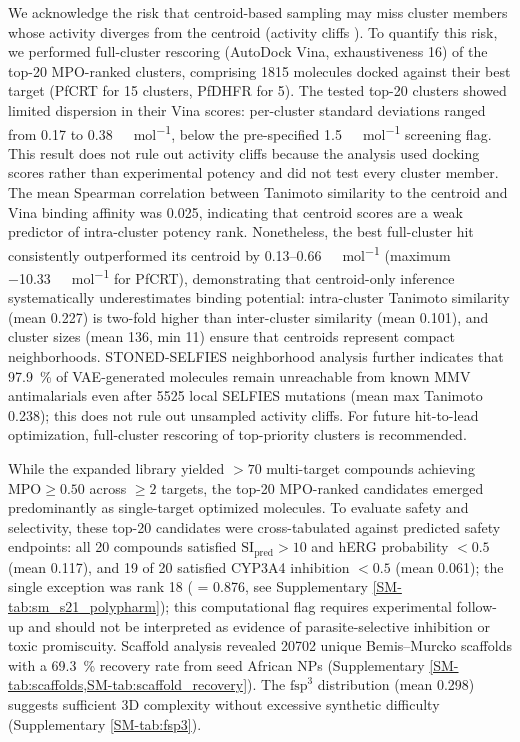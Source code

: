 \documentclass[journal=jcisd8,manuscript=article]{achemso}
\begin{document}
We acknowledge the risk that centroid-based sampling may miss cluster members whose activity diverges from the centroid (activity cliffs \cite{Maggiora2006}).
To quantify this risk, we performed full-cluster rescoring (AutoDock Vina, exhaustiveness \num{16}) of the top-20 MPO-ranked clusters, comprising \num{1815}
molecules docked against their best target (PfCRT for 15 clusters, PfDHFR for 5). The tested top-20 clusters showed limited dispersion in their Vina scores: per-cluster standard deviations ranged from \num{0.17} to \num{0.38}~\si{\kilo\calorie\per\mole}, below the pre-specified \qty{1.5}{\kilo\calorie\per\mole} screening flag. This result does not rule out activity cliffs because the analysis used docking scores rather than experimental potency and did not test every cluster member. The mean Spearman correlation between Tanimoto similarity to the centroid and
Vina binding affinity was \num{0.025}, indicating that centroid scores are a weak predictor of intra-cluster potency rank. Nonetheless, the best full-cluster
hit consistently outperformed its centroid by \numrange{0.13}{0.66}~\si{\kilo\calorie\per\mole} (maximum \qty{-10.33}{\kilo\calorie\per\mole} for PfCRT),
demonstrating that centroid-only inference systematically underestimates binding potential: intra-cluster Tanimoto similarity (mean \num{0.227}) is two-fold
higher than inter-cluster similarity (mean \num{0.101}), and cluster sizes (mean \num{136}, min \num{11}) ensure that centroids represent compact
neighborhoods. STONED-SELFIES neighborhood analysis further indicates that \qty{97.9}{\percent} of VAE-generated molecules remain unreachable from known MMV
antimalarials even after \num{5525} local SELFIES mutations (mean max Tanimoto \num{0.238}); this does not rule out unsampled activity cliffs. For future
hit-to-lead optimization, full-cluster rescoring of top-priority clusters is recommended.

 While the expanded library yielded $ > \num{70}$ multi-target compounds achieving $\text{MPO} \geq \num{0.50}$ across $\geq 2$ targets, the top-20 MPO-ranked
candidates emerged predominantly as single-target optimized molecules. To evaluate safety and selectivity, these top-20
candidates were cross-tabulated against predicted safety endpoints: all \num{20} compounds satisfied $\text{SI}_{\text{pred}} > \num{10}$ and hERG probability $<
\num{0.5}$ (mean \num{0.117}), and \num{19} of \num{20} satisfied CYP3A4 inhibition $< \num{0.5}$ (mean \num{0.061}); the single exception was rank \num{18}
( = \num{0.876}, see Supplementary \cref{SM-tab:sm_s21_polypharm}); this computational flag requires experimental follow-up and should not be interpreted as evidence of parasite-selective inhibition or toxic promiscuity. Scaffold analysis revealed \num{20702} unique Bemis--Murcko scaffolds with a \qty{69.3}{\percent}
recovery rate from seed African NPs (Supplementary \cref{SM-tab:scaffolds,SM-tab:scaffold_recovery}). The $\text{fsp}^3$ distribution (mean
\num{0.298}) suggests sufficient 3D complexity without excessive synthetic difficulty (Supplementary \cref{SM-tab:fsp3}).
\end{document}

